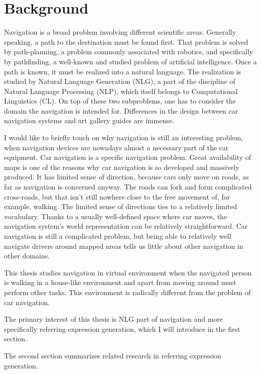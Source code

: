 \chapter{Background}
\label{chap:bg}
Navigation is a broad problem involving different scientific areas. Generally speaking, a path to the destination must be found first. That problem is solved by path-planning, a problem commonly associated with robotics, and specifically by pathfinding, a well-known and studied problem of artificial intelligence. Once a path is known, it must be realized into a natural language. The realization is studied by Natural Language Generation (NLG), a part of the discipline of Natural Language Processing (NLP), which itself belongs to Computational Linguistics (CL). On top of these two subproblems, one has to consider the domain the navigation is intended for. Differences in the design between car navigation systems and art gallery guides are immense.

I would like to briefly touch on why navigation is still an interesting problem, when navigation devices are nowadays almost a necessary part of the car equipment. Car navigation is a specific navigation problem. Great availability of maps is one of the reasons why car navigation is so developed and massively produced. It has limited sense of direction, because cars only move on roads, as far as navigation is concerned anyway. The roads can fork and form complicated cross-roads, but that isn't still nowhere close to the free movement of, for example, walking. The limited sense of directions ties to a relatively limited vocabulary. Thanks to a usually well-defined space where car moves, the navigation system's world representation can be relatively straightforward. Car navigation is still a complicated problem, but being able to relatively well navigate drivers around mapped areas tells us little about other navigation in other domains.

This thesis studies navigation in virtual environment when the navigated person is walking in a house-like environment and apart from moving around must perform other tasks. This environment is radically different from the problem of car navigation. 

The primary interest of this thesis is NLG part of navigation and more specifically referring expression generation, which I will introduce in the first section. 

The second section summarizes related research in referring expression generation. 


